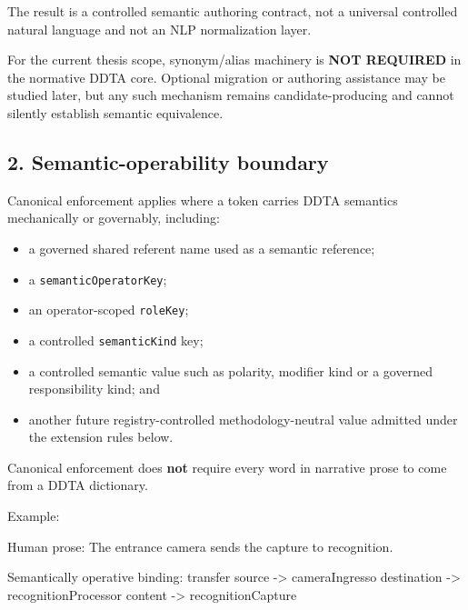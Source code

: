 \documentclass[
  10pt,
  a4paper,
]{article}
\newenvironment{Shaded}{}{}
\newcommand{\NormalTok}[1]{#1}
\providecommand{\tightlist}{%
  \setlength{\itemsep}{0pt}\setlength{\parskip}{0pt}}
\begin{document}
The result is a controlled semantic authoring contract, not a universal
controlled natural language and not an NLP normalization layer.

For the current thesis scope, synonym/alias machinery is \textbf{NOT
REQUIRED} in the normative DDTA core. Optional migration or authoring
assistance may be studied later, but any such mechanism remains
candidate-producing and cannot silently establish semantic equivalence.

\subsection{2. Semantic-operability
boundary}\label{2-semantic-operability-boundary}

Canonical enforcement applies where a token carries DDTA semantics
mechanically or governably, including:

\begin{itemize}
\tightlist
\item
  a governed shared referent name used as a semantic reference;
\item
  a \texttt{semanticOperatorKey};
\item
  an operator-scoped \texttt{roleKey};
\item
  a controlled \texttt{semanticKind} key;
\item
  a controlled semantic value such as polarity, modifier kind or a
  governed responsibility kind; and
\item
  another future registry-controlled methodology-neutral value admitted
  under the extension rules below.
\end{itemize}

Canonical enforcement does \textbf{not} require every word in narrative
prose to come from a DDTA dictionary.

Example:

\begin{Shaded}
\begin{Highlighting}[]
\NormalTok{Human prose:}
\NormalTok{  The entrance camera sends the capture to recognition.}

\NormalTok{Semantically operative binding:}
\NormalTok{  transfer}
\NormalTok{    source      {-}\textgreater{} cameraIngresso}
\NormalTok{    destination {-}\textgreater{} recognitionProcessor}
\NormalTok{    content     {-}\textgreater{} recognitionCapture}
\end{Highlighting}
\end{Shaded}
\end{document}
